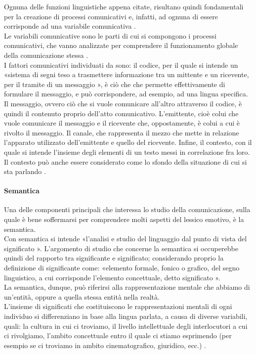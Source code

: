 Ognuna delle funzioni linguistiche appena citate, risultano quindi fondamentali per la creazione di processi comunicativi e, infatti, ad ognuna di essere corrisponde ad una variabile comunicativa \parencite{Jakobson}. \\
Le variabili comunicative sono le parti di cui si compongono i processi comunicativi, che vanno analizzate per comprendere il funzionamento globale della comunicazione stessa \parencite{linguistica_comunicazione}.\\
I fattori comunicativi individuati da sono: il codice, per il quale si intende un «sistema di segni teso a trasmettere informazione tra un mittente e un ricevente, per il tramite di un messaggio \parencite{fondamenti_linguistica}», è ciò che  che permette effettivamente di formulare il messaggio, e può corrispondere, ad esempio, ad una lingua specifica. Il messaggio, ovvero ciò che si vuole comunicare all'altro attraverso il codice, è quindi il contenuto proprio dell'atto comunicativo. L'emittente, cioè colui che vuole comunicare il messaggio e il ricevente che, oppostamente, è colui a cui è rivolto il messaggio. Il canale, che rappresenta il mezzo che mette in relazione l'apparato utilizzato dell'emittente e quello del ricevente. Infine, il contesto, con il quale si intende l'insieme degli elementi di un testo messi in correlazione fra loro. Il contesto può anche essere considerato come lo sfondo della situazione di cui si sta parlando \parencite{fondamenti_linguistica}.

\paragraph{Semantica} 
\label{par: Semantica}
Una delle componenti principali che interessa lo studio della comunicazione, sulla quale è bene soffermarsi per comprendere molti aspetti del lessico emotivo, è la semantica.\\
Con semantica si intende «l'analisi e studio del linguaggio dal punto di vista del significato \parencite{semantica}». L'argomento di studio che concerne la semantica si occuperebbe quindi del rapporto tra significante e significato; considerando proprio la definizione di significante come: «elemento formale, fonico o grafico, del segno linguistico, a cui corrisponde l'elemento concettuale, detto significato \parencite{significante}».\\
La semantica, dunque, può riferirsi alla rappresentazione mentale che abbiamo di un’entità, oppure a quella stessa entità nella realtà.\\
L'insieme di significati che costituiscono le rappresentazioni mentali di ogni individuo si differenziano in base alla lingua parlata, a causa di diverse variabili, quali: la cultura in cui ci troviamo, il livello intellettuale degli interlocutori a cui ci rivolgiamo, l'ambito concettuale entro il quale ci stiamo esprimendo (per esempio se ci troviamo in ambito cinematografico, giuridico, ecc.) \parencite{lessico_semnatica}. 

